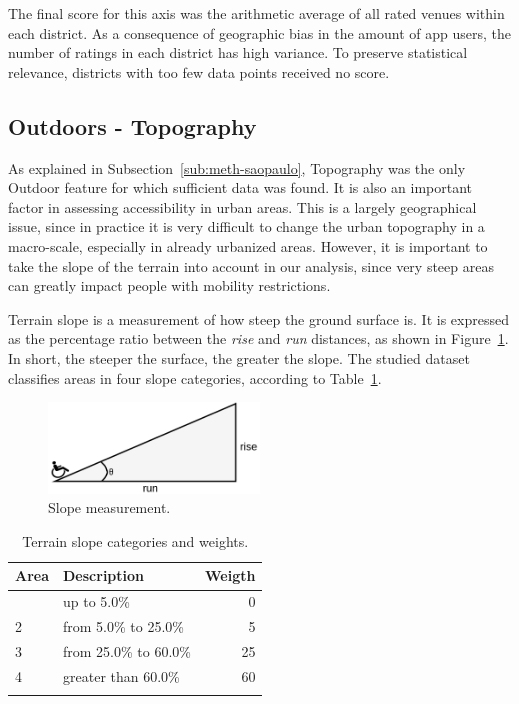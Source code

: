 \documentclass[12pt]{article}
\begin{document}
The final score for this axis was the arithmetic average of all rated venues within each district.
As a consequence of geographic bias in the amount of app users,
the number of ratings in each district has high variance.
To preserve statistical relevance, districts with too few data points received no score.

\subsection{Outdoors - Topography}
\label{sub:topography}

As explained in Subsection~\ref{sub:meth-saopaulo}, Topography was the only Outdoor feature for which sufficient data was found.
It is also an important factor in assessing accessibility in urban areas.
This is a largely geographical issue, since in practice it is very difficult to change the urban topography in a macro-scale,
especially in already urbanized areas.
However, it is important to take the slope of the terrain into account in our analysis,
since very steep areas can greatly impact people with mobility restrictions.

Terrain slope is a measurement of how steep the ground surface is.
It is expressed as the percentage ratio between the \textit{rise} and \textit{run} distances, as shown in Figure~\ref{fig:slope}.
In short, the steeper the surface, the greater the slope.
The studied dataset classifies areas in four slope categories, according to Table~\ref{tab:topography}.

\vspace{0.1cm}
\begin{figure}[h]
  \centering
  \includegraphics[width=0.50\textwidth]{slope}
  \caption{Slope measurement.}
  \label{fig:slope}
\end{figure}

\begin{table}[h]
  \small
  \centering
  \begin{tabular}{llr}
    \bottomrule\addlinespace[0.3em]
    Area & Description & Weigth \\
    \bottomrule\addlinespace[0.3em]
    1 & up to 5.0\%           & 0 \\
    2 & from 5.0\% to 25.0\%  & 5 \\
    3 & from 25.0\% to 60.0\% & 25\\
    4 & greater than 60.0\%   & 60\\
    \addlinespace[0.3em]
    \bottomrule
  \end{tabular}
  \caption{Terrain slope categories and weights.}
  \label{tab:topography}
\end{table}
\end{document}
